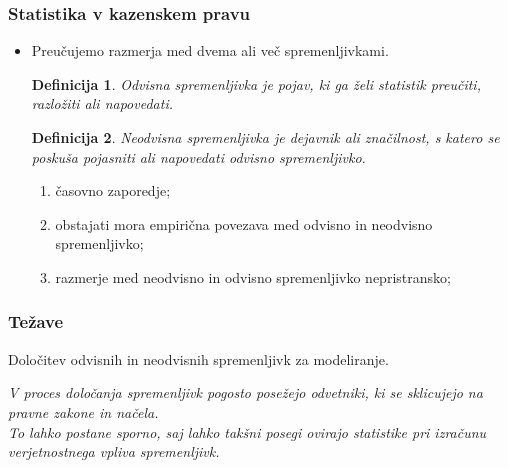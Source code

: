 \documentclass{beamer}
\newtheorem{definicija}{Definicija}
\begin{document}
\begin{frame}
    \frametitle{Statistika v kazenskem pravu}
    \begin{itemize}
        \item Preučujemo razmerja med dvema ali več spremenljivkami.\\ \vspace{2mm}
         \begin{definicija}
            \textit{Odvisna spremenljivka} je pojav, ki ga želi statistik preučiti, razložiti ali napovedati.
        \end{definicija}
        \begin{definicija}
            \textit{Neodvisna spremenljivka} je dejavnik ali značilnost, s katero se poskuša pojasniti ali napovedati odvisno spremenljivko.
        \end{definicija}        

        \begin{enumerate}
            \item časovno zaporedje;
            \item obstajati mora empirična povezava med odvisno in neodvisno spremenljivko;
            \item razmerje med neodvisno in odvisno spremenljivko nepristransko;
        \end{enumerate}
    \end{itemize}
\end{frame}

\begin{frame}
   \frametitle{Težave}
   \begin{block}{}
       \centering
       Določitev odvisnih in neodvisnih spremenljivk za modeliranje.
   \end{block}\vspace{3mm}
   \textit{
   V proces določanja spremenljivk pogosto posežejo odvetniki, ki se sklicujejo na pravne zakone in načela. \\
   To lahko postane sporno, saj lahko takšni posegi ovirajo statistike pri izračunu verjetnostnega vpliva spremenljivk.}
\end{frame}

\end{document}
